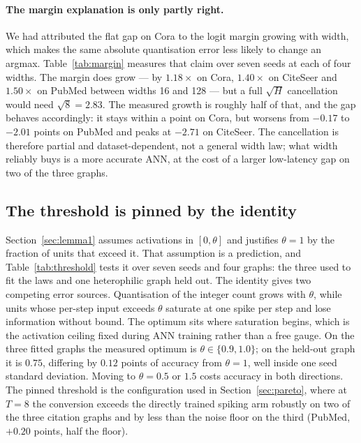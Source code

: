 \documentclass[10pt,twocolumn]{article}
\newcommand{\tabref}[1]{Table~\ref{#1}}
\newcommand{\secref}[1]{Section~\ref{#1}}
\begin{document}
\paragraph{The margin explanation is only partly right.} We had attributed the flat gap on Cora to
the logit margin growing with width, which makes the same absolute quantisation error less likely to
change an argmax. \tabref{tab:margin} measures that claim over seven seeds at each of four widths.
The margin does grow --- by $1.18\times$ on Cora, $1.40\times$ on CiteSeer and $1.50\times$ on
PubMed between widths 16 and 128 --- but a full $\sqrt{H}$ cancellation would need $\sqrt{8}=2.83$.
The measured growth is roughly half of that, and the gap behaves accordingly: it stays within a point
on Cora, but worsens from $-0.17$ to $-2.01$ points on PubMed and peaks at $-2.71$ on CiteSeer. The
cancellation is therefore partial and dataset-dependent, not a general width law; what width reliably
buys is a more accurate ANN, at the cost of a larger low-latency gap on two of the three graphs.

\subsection{The threshold is pinned by the identity}
\label{sec:threshold}


\secref{sec:lemma1} assumes activations in $[0,\theta]$ and justifies $\theta=1$ by the fraction of
units that exceed it. That assumption is a prediction, and \tabref{tab:threshold} tests it over
seven seeds and four graphs: the three used to fit the laws and one heterophilic graph held out.
The identity gives two competing error sources. Quantisation of the integer count grows with
$\theta$, while units whose per-step input exceeds $\theta$ saturate at one spike per step and lose
information without bound. The optimum sits where saturation begins, which is the activation ceiling
fixed during ANN training rather than a free gauge. On the three fitted graphs the measured optimum
is $\theta\in\{0.9,1.0\}$; on the held-out graph it is $0.75$, differing by $0.12$ points of
accuracy from $\theta=1$, well inside one seed standard deviation. Moving to $\theta=0.5$ or $1.5$
costs accuracy in both directions. The pinned threshold is the configuration used in
\secref{sec:pareto}, where at $T=8$ the conversion exceeds the directly trained spiking arm
robustly on two of the three citation graphs and by less than the noise floor on the third
(PubMed, $+0.20$ points, half the floor).
\end{document}

